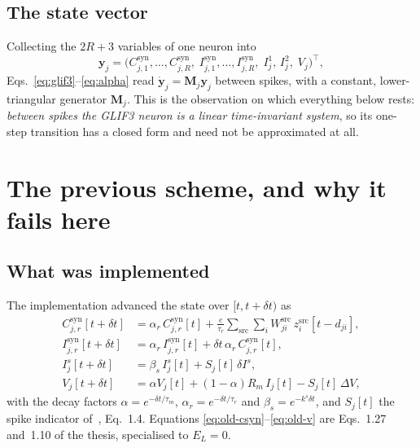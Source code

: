\documentclass[11pt,a4paper,numbers=noenddot]{scrartcl}
\newcommand{\dt}{\delta t}
\newcommand{\Isyn}{I^{\mathrm{syn}}}
\newcommand{\Csyn}{C^{\mathrm{syn}}}
\newcommand{\amem}{\alpha}
\newcommand{\asyn}{\alpha_{r}}
\begin{document}
\subsection{The state vector}

Collecting the $2R+3$ variables of one neuron into
%
\begin{equation}
\label{eq:statevec}
\bm{y}_j = \bigl(\Csyn_{j,1},\dots,\Csyn_{j,R},\;
                 \Isyn_{j,1},\dots,\Isyn_{j,R},\;
                 I^{1}_j,\,I^{2}_j,\; V_j\bigr)^{\!\top},
\end{equation}
%
Eqs.~\eqref{eq:glif3}--\eqref{eq:alpha} read $\dot{\bm y}_j = \bm{M}_j\bm{y}_j$
between spikes, with a constant, lower-triangular generator $\bm{M}_j$. This
is the observation on which everything below rests: \emph{between spikes the
GLIF3 neuron is a linear time-invariant system}, so its one-step transition
has a closed form and need not be approximated at all.

\section{The previous scheme, and why it fails here}
\label{sec:previous}

\subsection{What was implemented}

The implementation advanced the state over $[t, t+\dt)$ as
%
\begin{align}
\label{eq:old-csyn}
\Csyn_{j,r}[t+\dt] &= \asyn\, \Csyn_{j,r}[t]
  + \frac{e}{\tau_r}\sum_{\mathrm{src}}\sum_i
    W^{\mathrm{src}}_{ji}\, z^{\mathrm{src}}_i[t-d_{ji}],
\\
\label{eq:old-isyn}
\Isyn_{j,r}[t+\dt] &= \asyn\, \Isyn_{j,r}[t] + \dt\,\asyn\, \Csyn_{j,r}[t],
\\
\label{eq:old-asc}
I^{s}_j[t+\dt] &= \beta_s\, I^{s}_j[t] + S_j[t]\,\delta I^{s},
\\
\label{eq:old-v}
V_j[t+\dt] &= \amem V_j[t] + (1-\amem)R_m\, I_j[t] - S_j[t]\,\Delta V,
\end{align}
%
with the decay factors $\amem = e^{-\dt/\tau_m}$,
$\asyn = e^{-\dt/\tau_r}$ and $\beta_s = e^{-k^{s}\dt}$, and $S_j[t]$ the
spike indicator of~\cite{galvan2025thesis}, Eq.~1.4. Equations
\eqref{eq:old-csyn}--\eqref{eq:old-v} are Eqs.~1.27 and~1.10 of the thesis,
specialised to $E_L = 0$.
\end{document}
